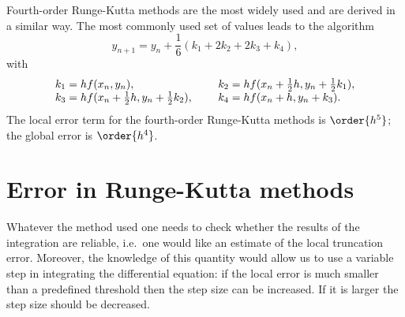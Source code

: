 Fourth-order Runge-Kutta methods are the most widely used and are
derived in a similar way. The most commonly used set of values leads
to the algorithm
%
\begin{equation}
  y_{n+1} = y_n + \frac{1}{6}(k_1+2k_2+2k_3+k_4),
  \label{IVP.eq:22}
\end{equation}
%
with
%
\begin{equation}
  \begin{array}{ll@{\hspace{5mm}}l}
    k_1=hf(x_n,y_n), & &
    k_2=hf(x_n+\frac{1}{2}h,y_n+\frac{1}{2}k_1), \\
    k_3=hf(x_n+\frac{1}{2}h,y_n+\frac{1}{2}k_2), & &
    k_4=hf(x_n+h,y_n+k_3).
  \end{array}
  \label{IVP.eq:23}
\end{equation}
%
The local error term for the fourth-order Runge-Kutta methods is
$\order{h^5}$; the global error is $\order{h^4}$.

\section{Error in Runge-Kutta methods}

Whatever the method used one needs to check whether the results of the
integration are reliable, i.e.\ one would like an estimate of the local
truncation error.  Moreover, the knowledge of this quantity would
allow us to use a variable step in integrating the differential
equation: if the local error is much smaller than a predefined
threshold then the step size can be increased.  If it is larger the
step size should be decreased.

